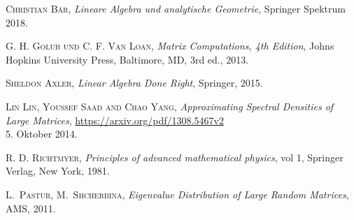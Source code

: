 
\begin{thebibliography}{56}

    \textsc{Christian Bär},
    \textit{Lineare Algebra und analytische Geometrie},
    Springer Spektrum
    2018.

    \textsc{G. H. Golub und C. F. Van Loan},
    \textit{Matrix Computations, 4th Edition},
    Johns Hopkins University Press,
    Baltimore, MD, 3rd ed.,
    2013.

    \textsc{Sheldon Axler},
    \textit{Linear Algebra Done Right},
    Springer,
    2015.

    \textsc{Lin Lin, Youssef Saad and Chao Yang},
    \textit{Approximating Spectral Densities of Large Matrices},
    \url{https://arxiv.org/pdf/1308.5467v2}\\
    5. Oktober 2014.

    \textsc{R. D. Richtmyer},
    \textit{Principles of advanced mathematical physics},
    vol 1, Springer Verlag,
    New York,
    1981.

    \textsc{L.~Pastur, M.~Shcherbina},
    \textit{Eigenvalue Distribution of Large Random Matrices},
    AMS,
    2011.

\end{thebibliography}